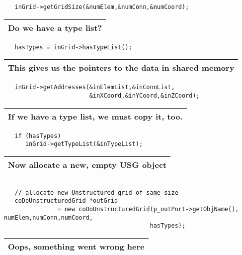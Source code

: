 \begin{verbatim}
   inGrid->getGridSize(&numElem,&numConn,&numCoord);
\end{verbatim}

\begin{longtable}{|l|}
\hline
   {\bf Do we have a type list?} \\
\hline
\end{longtable}

\begin{verbatim}       
   hasTypes = inGrid->hasTypeList();
\end{verbatim}

\begin{longtable}{|l|}
\hline
   {\bf This gives us the pointers to the data in shared memory} \\
\hline
\end{longtable}

\begin{verbatim}                                            
   inGrid->getAddresses(&inElemList,&inConnList,
                        &inXCoord,&inYCoord,&inZCoord);
\end{verbatim}

\begin{longtable}{|l|}
\hline
   {\bf If we have a type list, we must copy it, too.} \\
\hline
\end{longtable}

\begin{verbatim}    
   if (hasTypes)
      inGrid->getTypeList(&inTypeList);
\end{verbatim}

\begin{longtable}{|l|}
\hline
   {\bf Now allocate a new, empty USG object} \\
\hline
\end{longtable}

\begin{verbatim}                                       
   
   // allocate new Unstructured grid of same size
   coDoUnstructuredGrid *outGrid  
               = new coDoUnstructuredGrid(p_outPort->getObjName(),                                                                                                 numElem,numConn,numCoord,
                                         hasTypes);
\end{verbatim}

\begin{longtable}{|l|}
\hline
   {\bf Oops, something went wrong here} \\
\hline
\end{longtable}

